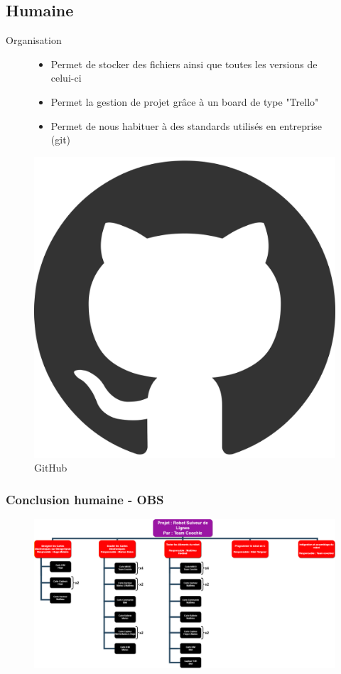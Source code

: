\subsection{Humaine}
\begin{frame}{Organisation}
    \begin{figure}[H]
        \centering
        \begin{minipage}{.5\textwidth}
            \centering
            \begin{itemize}
                \item Permet de stocker des fichiers ainsi que toutes les versions de celui-ci
                \item Permet la gestion de projet grâce à un board de type "Trello"
                \item Permet de nous habituer à des standards utilisés en entreprise (git)
            \end{itemize} 
        \end{minipage}%
        \begin{minipage}{.5\textwidth}
            \centering
            \includegraphics[width=.3\linewidth]{Images/github.png}
            \caption{GitHub}
            \label{fig:fun}
        \end{minipage}%
    \end{figure}
\end{frame}
\begin{frame}
    \frametitle{Conclusion humaine - OBS}
    \begin{figure}[H]
            \centering
            \includegraphics[width=0.8\linewidth]{Images/OBS.drawio.png}
    \end{figure}

\footer{\hfill\insertframenumber/\inserttotalframenumber}
\end{frame}